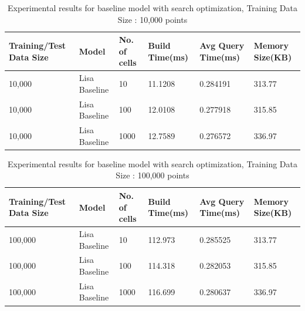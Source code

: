 \begin{table}[ht]
	\centering
	\begin{tabular}{||p{}<{\centering}|p{}<{\centering}| p{}<{\centering}|p{}<{\centering}|p{}<{\centering}|p{}<{\centering}||}
		\hline
		Training/Test Data Size& Model & No. of cells & Build Time(ms) & Avg Query Time(ms) & Memory Size(KB)\\ [0.5ex] 
		\hline
		\hline
		10,000& Lisa Baseline & 10 & 11.1208 & 0.284191 & 313.77\\
		\hline
		10,000& Lisa Baseline & 100 & 12.0108 & 0.277918 & 315.85\\
		\hline
		10,000& Lisa Baseline & 1000 & 12.7589 & 0.276572 & 336.97\\
		\hline
		\hline
	\end{tabular}
	\caption{Experimental results for baseline model with search optimization, Training Data Size : 10,000 points}
	\label{baseline_search_optimization_10000}

\end{table}

\begin{table}[ht]
	\centering
	\begin{tabular}{||p{}<{\centering}|p{}<{\centering}| p{}<{\centering}|p{}<{\centering}|p{}<{\centering}|p{}<{\centering}||}
		\hline
		Training/Test Data Size& Model & No. of cells & Build Time(ms) & Avg Query Time(ms) & Memory Size(KB)\\ [0.5ex] 
		\hline
		\hline
		100,000& Lisa Baseline & 10 & 112.973 & 0.285525 & 313.77\\
		\hline
		100,000& Lisa Baseline & 100 & 114.318 & 0.282053 & 315.85\\
		\hline
		100,000& Lisa Baseline & 1000 & 116.699 & 0.280637 & 336.97\\
		\hline
		\hline
	\end{tabular}
	\caption{Experimental results for baseline model with search optimization, Training Data Size : 100,000 points}
	\label{baseline_search_optimization_100000}

\end{table}

